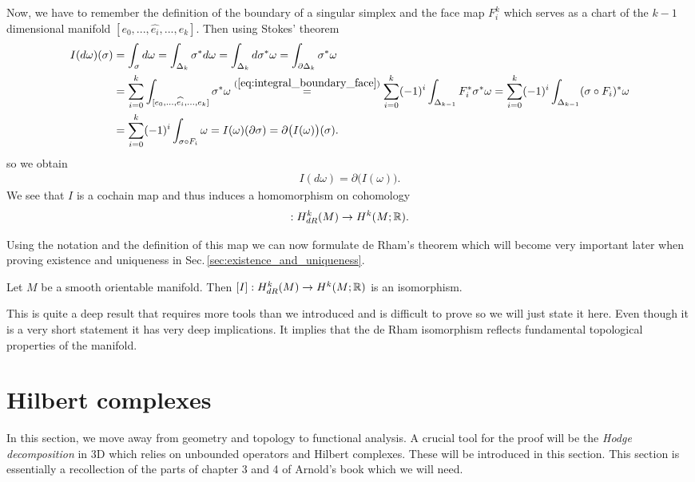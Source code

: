 \documentclass[../main.tex]{subfiles}
\begin{document}
Now, 
we have to remember the definition of the boundary of a singular simplex 
and the face map $F^k_i$ which serves as a chart 
of the $k-1$ dimensional manifold $[e_0,...,\widehat{e_i}, ..., e_k]$. 
Then using Stokes' theorem 
\begin{align*}
    I(d\omega)(\sigma) &= \int_\sigma d\omega 
    = \int_{\Delta_k} \sigma^* d\omega 
    = \int_{\Delta_k} d\sigma^* \omega
    = \int_{\partial \Delta_k} \sigma^* \omega
    \\ &= \sum_{i=0}^k \int_{[e_0,...,\widehat{e_i}, ..., e_k]} \sigma^* \omega
    \stackrel{(\ref{eq:integral_boundary_face})}{=} \sum_{i=0}^{k} (-1)^i \int_{\Delta_{k-1}} F_i^*\sigma^* \omega
    = \sum_{i=0}^{k} (-1)^i \int_{\Delta_{k-1}} (\sigma\circ F_i)^* \omega
    \\ &= \sum_{i=0}^{k} (-1)^i \int_{\sigma\circ F_i} \omega
    = I(\omega)(\partial \sigma) = \partial \big(I(\omega)\big) (\sigma).
\end{align*}
so we obtain
\begin{align*}
    I(d\omega) = \partial \big(I(\omega)\big).
\end{align*}
We see that $I$ is a cochain map and thus 
induces a homomorphism on cohomology
\begin{align*}
    [I]:H^k_{dR}(M) \rightarrow H^k(M;\real).
\end{align*}

Using the notation and the definition of this map we can now formulate 
de Rham's theorem which will become very important later when proving
existence and uniqueness in Sec.\,\ref{sec:existence_and_uniqueness}.
\begin{theorem}\label{thm:de_rhams_theorem}
    Let $M$ be a smooth orientable manifold. Then $[I]: H^k_{dR}(M) \rightarrow H^k(M;\mathbb{R})$ is an isomorphism.
\end{theorem}
This is quite a deep result that requires more tools than we introduced and is
difficult to prove so we will just state it here. Even though it is a very short 
statement it has very deep implications. It implies that the de Rham isomorphism
reflects fundamental topological properties of the manifold.

\section{Hilbert complexes}\label{sec:hilbert_complexes}
In this section, we move away from geometry and topology to functional analysis.
A crucial tool for the proof will be the \textit{Hodge decomposition} 
in 3D which relies on unbounded operators and Hilbert complexes. These 
will be introduced in this section. This section is essentially a 
recollection of the parts of chapter 3 and 4 of Arnold's book \cite{arnold}
which we will need. 
\end{document}
